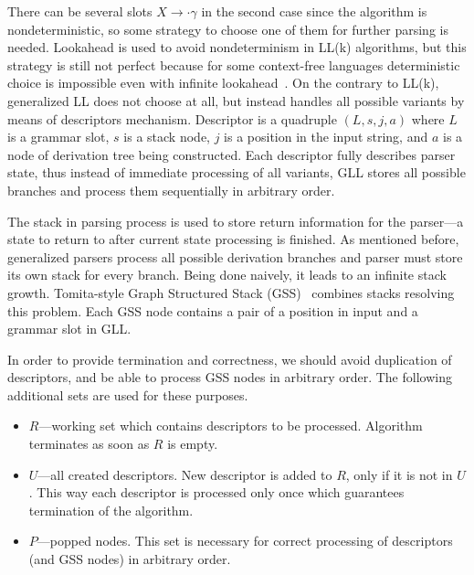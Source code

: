 There can be several slots $X \rightarrow \cdot \gamma$ in the second case since the algorithm is nondeterministic, so some strategy to choose one of them for further parsing is needed.
Lookahead is used to avoid nondeterminism in LL(k) algorithms, but this strategy is still not perfect because for some context-free languages deterministic choice is impossible even with infinite lookahead~\cite{LLnonLL}.
On the contrary to LL(k), generalized LL does not choose at all, but instead handles all possible variants by means of descriptors mechanism.
Descriptor is a quadruple $(L, s, j, a)$ where $L$ is a grammar slot, $s$ is a stack node, $j$ is a position in the input string, and $a$ is a node of derivation tree being constructed.
Each descriptor fully describes parser state, thus instead of immediate processing of all variants, GLL stores all possible branches and process them sequentially in arbitrary order.

The stack in parsing process is used to store return information for the parser---a state to return to after current state processing is finished.
As mentioned before, generalized parsers process all possible derivation branches and parser must store its own stack for every branch. 
Being done naively, it leads to an infinite stack growth.
Tomita-style Graph Structured Stack (GSS)~\cite{Tomita} combines stacks resolving this problem.
Each GSS node contains a pair of a position in input and a grammar slot in GLL. 

In order to provide termination and correctness, we should avoid duplication of descriptors, and be able to process GSS nodes in arbitrary order. The following additional sets are used for these purposes.
\begin{itemize}
\item $R$---working set which contains descriptors to be processed. Algorithm terminates as soon as $R$ is empty.
\item $U$---all created descriptors. New descriptor is added to $R$, only if it is not in $U$.
This way each descriptor is processed only once which guarantees termination of the algorithm.
\item $P$---popped nodes. This set is necessary for correct processing of descriptors (and GSS nodes) in arbitrary order.
\end{itemize}


